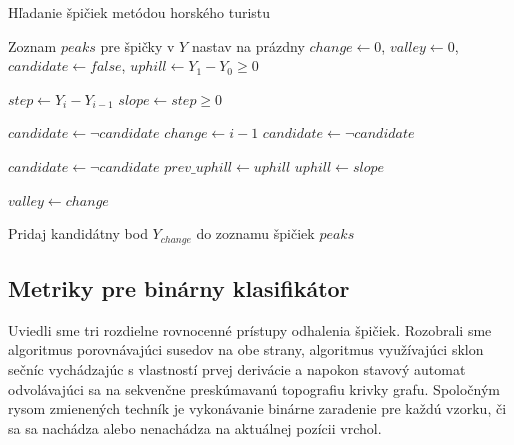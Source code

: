 \begin{algorithm}[h]
\caption{Hľadanie špičiek metódou horského turistu}
\begin{algorithmic}[1]
\State Zoznam $peaks$ pre špičky v $Y$ nastav na prázdny
\State $change \gets 0$, $valley \gets 0$, $candidate \gets false$, $uphill \gets Y_1 - Y_0 \geq 0$

	\State $step \gets Y_i - Y_{i-1}$
    \State $slope \gets step \geq 0$

    	\State $candidate \gets \neg candidate$   
        \State $change \gets i - 1$
       	\State $candidate \gets \neg candidate$  
    \EndIf


        \State $candidate \gets \neg candidate$
        \State $prev\_uphill \gets uphill$      
        \State $uphill \gets slope$

			\State $valley \gets change$   


				\State Pridaj kandidátny bod $Y_{change}$ do zoznamu špičiek $peaks$
            \EndIf
        \EndIf
\EndFor
\end{algorithmic}
\label{algo:mountain-hiker}
\end{algorithm}

\subsection{Metriky pre binárny klasifikátor}
Uviedli sme tri rozdielne rovnocenné prístupy odhalenia špičiek. Rozobrali sme algoritmus porovnávajúci susedov na obe strany,
algoritmus využívajúci sklon sečníc vychádzajúc s vlastností prvej derivácie a napokon
stavový automat odvolávajúci sa na sekvenčne preskúmavanú topografiu krivky grafu. Spoločným rysom zmienených techník
je vykonávanie binárne zaradenie pre každú vzorku, či sa sa nachádza alebo nenachádza na aktuálnej pozícii vrchol.

